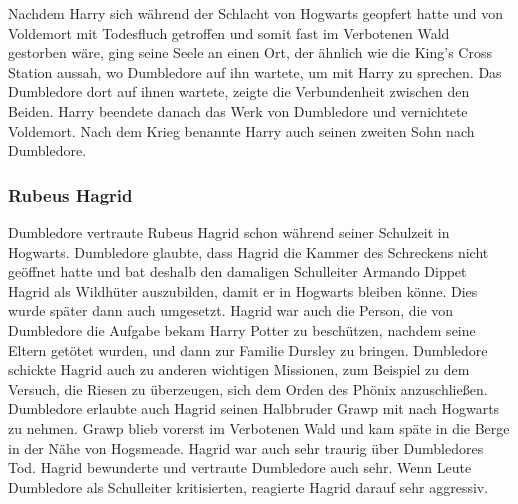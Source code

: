 \documentclass[a4paper, 10pt]{article}
\begin{document}
\vspace{10pt}
\newline
Nachdem Harry sich während der Schlacht von Hogwarts geopfert hatte und von Voldemort mit Todesfluch getroffen und somit fast im Verbotenen Wald gestorben wäre, ging seine Seele an einen Ort, der ähnlich wie die King's Cross Station aussah, wo Dumbledore auf ihn wartete, um mit Harry zu sprechen. Das Dumbledore dort auf ihnen wartete, zeigte die Verbundenheit zwischen den Beiden. Harry beendete danach das Werk von Dumbledore und vernichtete Voldemort. Nach dem Krieg benannte Harry auch seinen zweiten Sohn nach Dumbledore.
\subsubsection*{\large Rubeus Hagrid}
Dumbledore vertraute Rubeus Hagrid schon während seiner Schulzeit in Hogwarts. Dumbledore glaubte, dass Hagrid die Kammer des Schreckens nicht geöffnet hatte und bat deshalb den damaligen Schulleiter Armando Dippet Hagrid als Wildhüter auszubilden, damit er in Hogwarts bleiben könne. Dies wurde später dann auch umgesetzt. Hagrid war auch die Person, die von Dumbledore die Aufgabe bekam Harry Potter zu beschützen, nachdem seine Eltern getötet wurden, und dann zur Familie Dursley zu bringen. Dumbledore schickte Hagrid auch zu anderen wichtigen Missionen, zum Beispiel zu dem Versuch, die Riesen zu überzeugen, sich dem Orden des Phönix anzuschließen. Dumbledore erlaubte auch Hagrid seinen Halbbruder Grawp mit nach Hogwarts zu nehmen. Grawp blieb vorerst im Verbotenen Wald und kam späte in die Berge in der Nähe von Hogsmeade. Hagrid war auch sehr traurig über Dumbledores Tod. Hagrid bewunderte und vertraute Dumbledore auch sehr. Wenn Leute Dumbledore als Schulleiter kritisierten, reagierte Hagrid darauf sehr aggressiv.
\end{document}

